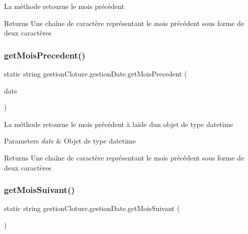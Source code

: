 La méthode retourne le mois précédent 

\begin{DoxyReturn}{Returns}
Une chaîne de caractère représentant le mois précédent sous forme de deux caractères
\end{DoxyReturn}
\mbox{\label{classgestion_cloture_1_1gestion_date_a0cc7cfb2a7874100e6276188f229819f}} 
\subsubsection{\texorpdfstring{get\+Mois\+Precedent()}{getMoisPrecedent()}\hspace{0.1cm}{\footnotesize\ttfamily [2/2]}}
{\footnotesize\ttfamily static string gestion\+Cloture.\+gestion\+Date.\+get\+Mois\+Precedent (\begin{DoxyParamCaption}\item[{Date\+Time}]{date }\end{DoxyParamCaption})\hspace{0.3cm}{\ttfamily [static]}}



La méthode retourne le mois précédent à l\textquotesingle{}aide d\textquotesingle{}un objet de type datetime 


\begin{DoxyParams}{Parameters}
{\em date} & Objet de type datetime\\
\hline
\end{DoxyParams}
\begin{DoxyReturn}{Returns}
Une chaîne de caractère représentant le mois précédent sous forme de deux caractères
\end{DoxyReturn}
\mbox{\label{classgestion_cloture_1_1gestion_date_aa30693cc45b10c009399d7a547f07dee}} 
\subsubsection{\texorpdfstring{get\+Mois\+Suivant()}{getMoisSuivant()}\hspace{0.1cm}{\footnotesize\ttfamily [1/2]}}
{\footnotesize\ttfamily static string gestion\+Cloture.\+gestion\+Date.\+get\+Mois\+Suivant (\begin{DoxyParamCaption}{ }\end{DoxyParamCaption})\hspace{0.3cm}{\ttfamily [static]}}



